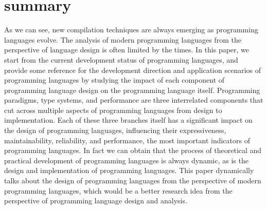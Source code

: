 \section{summary}

As we can see, new compilation techniques are always emerging as programming languages evolve. The analysis of modern programming languages from the perspective of language design is often limited by the times. In this paper, we start from the current development status of programming languages, and provide some reference for the development direction and application scenarios of programming languages by studying the impact of each component of programming language design on the programming language itself. Programming paradigms, type systems, and performance are three interrelated components that cut across multiple aspects of programming languages from design to implementation. Each of these three branches itself has a significant impact on the design of programming languages, influencing their expressiveness, maintainability, reliability, and performance, the most important indicators of programming languages. In fact we can obtain that the process of theoretical and practical development of programming languages is always dynamic, as is the design and implementation of programming languages. This paper dynamically talks about the design of programming languages from the perspective of modern programming languages, which would be a better research idea from the perspective of programming language design and analysis.